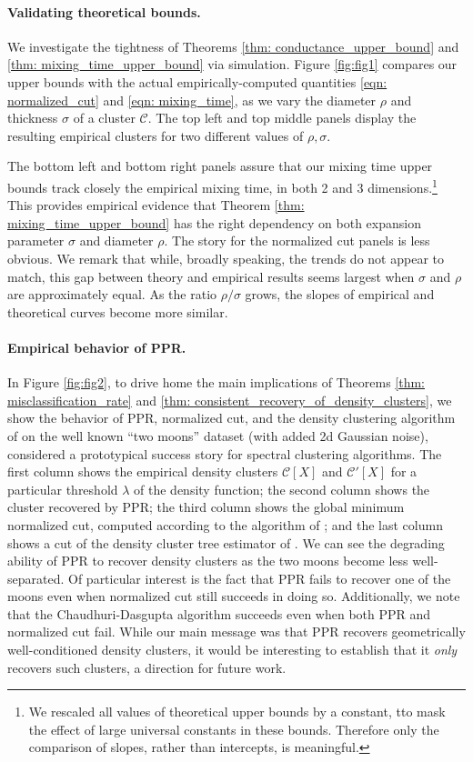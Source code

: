 \documentclass[11pt,twoside]{article}
\newcommand{\1}{\mathbf{1}}
\newcommand{\Xbf}{X}             %
\newcommand{\Cset}{\mathcal{C}}
\begin{document}
\paragraph{Validating theoretical bounds.}  We investigate the tightness of
Theorems \ref{thm: conductance_upper_bound} and \ref{thm:
  mixing_time_upper_bound} via simulation. Figure \ref{fig:fig1} compares our
upper bounds with the actual empirically-computed quantities \eqref{eqn:
  normalized_cut} and \eqref{eqn: mixing_time}, as we vary the diameter $\rho$
and thickness $\sigma$ of a cluster $\Cset$. The top left and top middle panels
display the resulting empirical clusters for two different values of
$\rho,\sigma$. 

The bottom left and bottom right panels assure that our mixing  
time upper bounds track closely the empirical mixing time, in both 2 and 3 
dimensions.\footnote{We rescaled all values of theoretical upper
  bounds by a constant, tto mask the effect of large universal constants
  in these bounds. Therefore only the comparison of slopes, rather than
  intercepts, is meaningful.} This provides empirical evidence that Theorem
\ref{thm: mixing_time_upper_bound} has the right dependency on both expansion
parameter $\sigma$ and diameter $\rho$. The story for the normalized cut panels
is less obvious. We remark that while, broadly speaking, the trends do not
appear to match, this gap between theory and empirical results seems largest
when $\sigma $ and $\rho$ are approximately equal. As the ratio $\rho/\sigma$
grows, the slopes of empirical and theoretical curves become more similar.

\paragraph{Empirical behavior of PPR.} In Figure \ref{fig:fig2}, to drive home
the main implications of Theorems \ref{thm: misclassification_rate} and
\ref{thm: consistent_recovery_of_density_clusters}, we show the
behavior of PPR, normalized cut, and the density clustering algorithm of
\citet{chaudhuri2010} on the well known ``two moons'' dataset (with added 2d 
Gaussian noise), considered a prototypical success story for spectral clustering
algorithms. The first column shows the empirical density clusters $\Cset[\Xbf]$
and $\Cset'[\Xbf]$ for a particular threshold $\lambda$ of the density function; the 
second column shows the cluster recovered by PPR; the third column shows the
global minimum normalized cut, computed according to the algorithm of
\citet{szlam2010}; and the last column shows a cut of the density cluster tree
estimator of \citet{chaudhuri2010}.  We can see the degrading ability of PPR to
recover density clusters as the two moons become less well-separated. Of 
particular interest is the fact that PPR fails to recover one of the moons even
when normalized cut still succeeds in doing so. Additionally, we note that the Chaudhuri-Dasgupta algorithm succeeds even when both PPR and normalized cut fail.  While our main message was
that PPR recovers geometrically well-conditioned density clusters, it would be  
interesting to establish that it \emph{only} recovers such clusters, a direction
for future work.   
\end{document}
